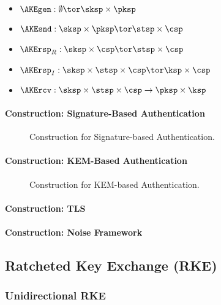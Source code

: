 \documentclass[a4paper,orivec]{llncs}
\begin{document}
\begin{itemize}
    \item $\AKEgen: \emptyset \tor \sksp\times\pksp$
    \item $\AKEsnd: \sksp\times\pksp \tor \stsp\times\csp$
    \item $\AKErsp_R: \sksp\times\csp \tor \stsp\times\csp$
    \item $\AKErsp_I: \sksp\times\stsp\times\csp \tor \ksp\times\csp$
    \item $\AKErcv: \sksp\times\stsp\times\csp \to \pksp\times\ksp$
\end{itemize}

\paragraph{Construction: Signature-Based Authentication}

\begin{figure}[!ht]
      \centering
      \fbox{\scalebox{\codescalefactor}{}}
      \caption{Construction for Signature-based Authentication.}
      \label{fig:sig_based_auth}
\end{figure}

\paragraph{Construction: KEM-Based Authentication}

\begin{figure}[!ht]
     \centering
     \fbox{\scalebox{\codescalefactor}{}}
     \caption{Construction for KEM-based Authentication.}
     \label{fig:kem_based_auth}
\end{figure}

\paragraph{Construction: TLS}

\paragraph{Construction: Noise Framework}


\subsection{Ratcheted Key Exchange (RKE)}

\subsubsection{Unidirectional RKE}
\end{document}
